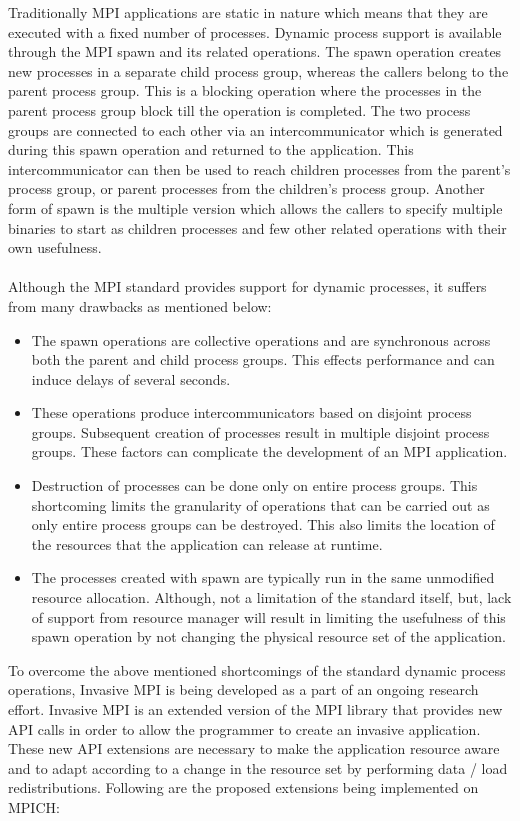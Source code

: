 Traditionally MPI applications are static in nature which means that they are executed with a fixed number of processes. Dynamic process support is available through the MPI spawn and its related operations. The spawn operation creates new processes in a separate child process group, whereas the callers belong to the parent process group. This is a blocking operation where the processes in the parent process group block till the operation is completed. The two process groups are connected to each other via an intercommunicator which is generated during this spawn operation and returned to the application. This intercommunicator can then be used to reach children processes from the parent's process group, or parent processes from the children's process group. Another form of spawn is the multiple version which allows the callers to specify multiple binaries to start as children processes and few other related operations with their own usefulness.\\ \\
\noindent
Although the MPI standard provides support for dynamic processes, it suffers from many drawbacks as mentioned below:
\begin{itemize}
\item The spawn operations are collective operations and are synchronous across both the parent and child process groups. This effects performance and can induce delays of several seconds.
\item These operations produce intercommunicators based on disjoint process groups. Subsequent creation of processes result in multiple disjoint process groups. These factors can complicate the development of an MPI application.
\item Destruction of processes can be done only on entire process groups. This shortcoming limits the granularity of operations that can be carried out as only entire process groups can be destroyed. This also limits the location of the resources that the application can release at runtime.
\item The processes created with spawn are typically run in the same unmodified resource allocation. Although, not a limitation of the standard itself, but, lack of support from resource manager will result in limiting the usefulness of this spawn operation by not changing the physical resource set of the application.
\end{itemize}
\noindent
To overcome the above mentioned shortcomings of the standard dynamic process operations, Invasive MPI is being developed as a part of an ongoing research effort. Invasive MPI is an extended version of the MPI library that provides new API calls in order to allow the programmer to create an invasive application. These new API extensions are necessary to make the application resource aware and to adapt according to a change in the resource set by performing data / load redistributions. Following are the proposed extensions being implemented on MPICH:\\ \\
